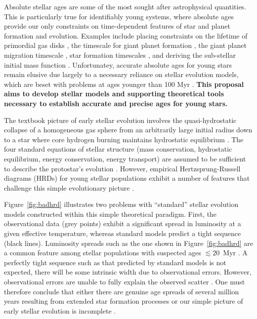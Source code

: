 %
%

Absolute stellar ages are some of the most sought after astrophysical quantities. This is particularly true for identifiably young systems, where absolute ages provide our only constraints on time-dependent features of star and planet formation and evolution. Examples include placing constraints on the lifetime of primordial gas disks \citep[e.g.,][]{Haisch2001, Mamajek2009}, the timescale for giant planet formation \citep{Chabrier2014}, the giant planet migration timescale \citep{}, star formation timescales \citep{Pecaut2016}, and deriving the sub-stellar initial mass function \citep{Chabrier2003}. Unfortunatey, accurate absolute ages for young stars remain elusive \citep{Soderblom2014} due largely to a necessary reliance on stellar evolution models, which are beset with problems at ages younger than 100 Myr \citep[e.g.,][]{Mathieu2007, Stassun2014}. {\bf This proposal aims to develop stellar models and supporting theoretical tools necessary to establish accurate and precise ages for young stars.}

The textbook picture of early stellar evolution involves the quasi-hydrostatic collapse of a homogeneous gas sphere from an arbitrarily large initial radius down to a star where core hydrogen burning maintains hydrostatic equilibrium \citep[e.g.,][]{Henyey1955, Hayashi1961, Iben1965}. The four standard equations of stellar structure (mass conservation, hydrostatic equilibrium, energy conservation, energy transport) are assumed to be sufficient to describe the protostar's evolution \citep{Iben1965, Bodenheimer1965}. However, 
empirical Hertzsprung-Russell diagrams (HRDs) for young stellar populations exhibit a number of features that challenge this simple evolutionary picture \citep{Naylor2009, DaRio2010a, Herczeg2015}. 

Figure~\ref{fig:badhrd} illustrates two problems with ``standard'' stellar evolution models constructed within this simple theoretical paradigm. First, the observational data (grey points) exhibit a significant spread in luminosity at a given effective temperature, whereas standard models predict a tight sequence (black lines). Luminosity spreads such as the one shown in Figure~\ref{fig:badhrd} are a common feature among stellar populations with suspected ages $\lesssim 20$~Myr \citep{Hillenbrand1997, Hartmann2001, DaRio2010a}. A perfectly tight sequence such as that predicted by standard models is not expected, there will be some intrinsic width due to observational errors. However, observational errors are unable to fully explain the observed scatter \citep[e.g.,][]{Jeffries2012, Pecaut2012}. One must therefore conclude that either there are genuine age spreads of several million years resulting from extended star formation processes or our simple picture of early stellar evolution is incomplete \citep{Jeffries2012, Soderblom2014}.

